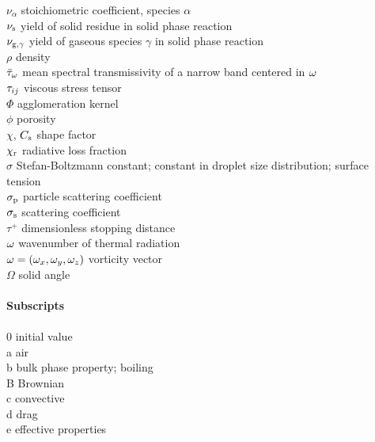 \begin{tabbing}
$\nu_\alpha$              \> stoichiometric coefficient, species $\alpha$ \\
$\nu_{\rm s}$             \> yield of solid residue in solid phase reaction \\
$\nu_{\rm g,\gamma}$      \> yield of gaseous species $\gamma$ in solid phase reaction \\
$\rho$                    \> density \\
$\bar{\tau}_{\omega}$        \> mean spectral transmissivity of a narrow band centered in $\omega$ \\
$\mathbf{\tau}_{ij}$              \> viscous stress tensor \\
$\Phi$                    \> agglomeration kernel \\
$\phi$                    \> porosity \\
$\chi$, $C_{\rm s}$       \> shape factor \\
$\chi_{\rm r}$            \> radiative loss fraction \\
$\sigma$                  \> Stefan-Boltzmann constant; constant in droplet size distribution; surface tension \\
$\sigma_{\rm p}$          \> particle scattering coefficient \\
$\sigma_{\rm s}$          \> scattering coefficient \\
$\tau^+$                  \> dimensionless stopping distance \\
$\omega$                     \> wavenumber of thermal radiation \\
${\mathbf{\omega}}=(\omega_x,\omega_y,\omega_z)$    \> vorticity vector \\
$\Omega$                  \> solid angle \\
\hspace{0.1in}            \> \\
{\bf Subscripts}          \> \\
\hspace{0.1in}            \> \\
0                         \> initial value \\
a                         \> air \\
b                         \> bulk phase property; boiling \\
B                         \> Brownian \\
c                         \> convective \\
d                         \> drag \\
e                         \> effective properties \\

\end{tabbing}
